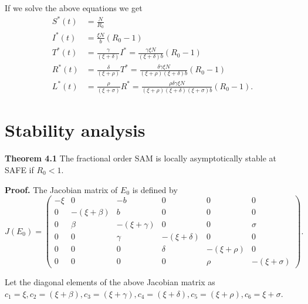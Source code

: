\documentclass[10pt]{article}
\begin{document}
	If we solve the above equations we get
	\begin{align}
		S^{\ast}(t) &= \frac{N}{R_{0}} \\
		I^{\ast}(t) &= \frac{\xi N}{b}(R_{0} - 1) \\
		T^{\ast}(t) &= \frac{\gamma}{(\xi + \delta)} I^{\ast} = \frac{\gamma\xi N}{(\xi + \delta)b}(R_{0} - 1) \\
		R^{\ast}(t) &= \frac{\delta}{(\xi + \rho)}T^{\ast} = \frac{\delta\gamma\xi N}{(\xi + \rho)(\xi + \delta)b}(R_{0} - 1) \\
		L^{\ast}(t) &= \frac{\rho}{(\xi + \sigma)}R^{\ast} = \frac{\rho\delta\gamma\xi N}{(\xi + \rho)(\xi + \delta)(\xi + \sigma)b}(R_{0} - 1).
	\end{align}
	
	\section{Stability analysis}
	
	\textbf{Theorem 4.1} The fractional order SAM is locally asymptotically stable at SAFE if $R_{0} < 1.$
	
	\textbf{Proof.} The Jacobian matrix of $E_{0}$ is defined by
	\begin{equation}
		J(E_{0}) = 
		\begin{pmatrix}
			-\xi & 0 & -b & 0 & 0 & 0 \\
			0 & -(\xi + \beta) & b & 0 & 0 & 0 \\
			0 & \beta & -(\xi + \gamma) & 0 & 0 & \sigma \\
			0 & 0 & \gamma & -(\xi + \delta) & 0 & 0 \\
			0 & 0 & 0 & \delta & -(\xi + \rho) & 0 \\
			0 & 0 & 0 & 0 & \rho & -(\xi + \sigma)
		\end{pmatrix}.
		\label{eq:jacobianE0}
	\end{equation}
	
	Let the diagonal elements of the above Jacobian matrix as $c_{1} = \xi, c_{2} = (\xi+\beta), c_{3} = (\xi+\gamma), c_{4} = (\xi+\delta), c_{5} = (\xi+\rho), c_{6} = \xi+\sigma$.
	
\end{document}
